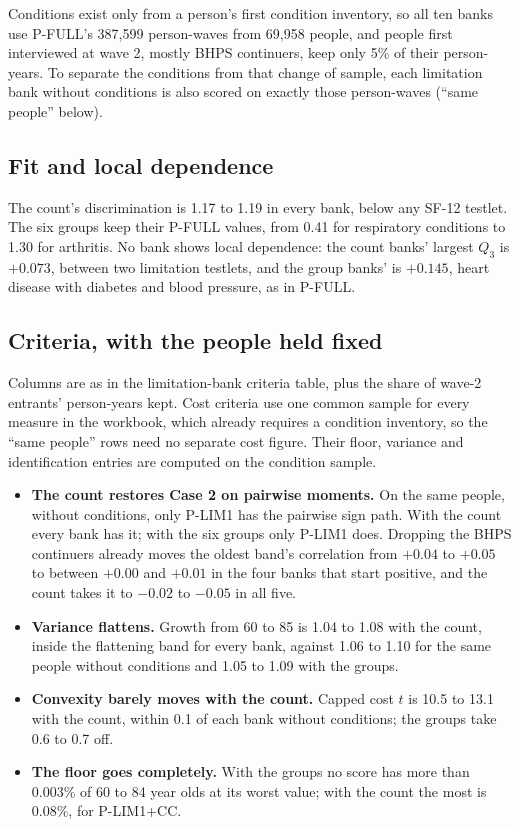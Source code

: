 \documentclass[11pt]{article}
\begin{document}
Conditions exist only from a person's first condition inventory, so all ten
banks use P-FULL's 387{,}599 person-waves from 69{,}958 people, and people
first interviewed at wave 2, mostly BHPS continuers, keep only 5\% of their
person-years. To separate the conditions from that change of sample, each
limitation bank without conditions is also scored on exactly those
person-waves (``same people'' below).



\subsection{Fit and local dependence}



The count's discrimination is 1.17 to 1.19 in every bank, below any SF-12
testlet. The six groups keep their P-FULL values, from 0.41 for respiratory
conditions to 1.30 for arthritis. No bank shows local dependence: the count
banks' largest $Q_3$ is $+0.073$, between two limitation testlets, and the group
banks' is $+0.145$, heart disease with diabetes and blood pressure, as in
P-FULL.

\subsection{Criteria, with the people held fixed}
Columns are as in the limitation-bank criteria table, plus the share of
wave-2 entrants' person-years kept. Cost criteria use one common sample for
every measure in the workbook, which already requires a condition inventory,
so the ``same people'' rows need no separate cost figure. Their floor,
variance and identification entries are computed on the condition sample.



\begin{itemize}\itemsep2pt
\item \textbf{The count restores Case 2 on pairwise moments.} On the same
people, without conditions, only P-LIM1 has the pairwise sign path. With the
count every bank has it; with the six groups only P-LIM1 does. Dropping the
BHPS continuers already moves the oldest band's correlation from $+0.04$ to
$+0.05$ to between $+0.00$ and $+0.01$ in the four banks that start positive, and
the count takes it to $-0.02$ to $-0.05$ in all five.
\item \textbf{Variance flattens.} Growth from 60 to 85 is 1.04 to 1.08 with the
count, inside the flattening band for every bank, against 1.06 to 1.10 for the
same people without conditions and 1.05 to 1.09 with the groups.
\item \textbf{Convexity barely moves with the count.} Capped cost $t$ is 10.5
to 13.1 with the count, within 0.1 of each bank without conditions; the groups
take 0.6 to 0.7 off.
\item \textbf{The floor goes completely.} With the groups no score has more
than 0.003\% of 60 to 84 year olds at its worst value; with the count the
most is 0.08\%, for P-LIM1+CC.
\end{itemize}
\end{document}
